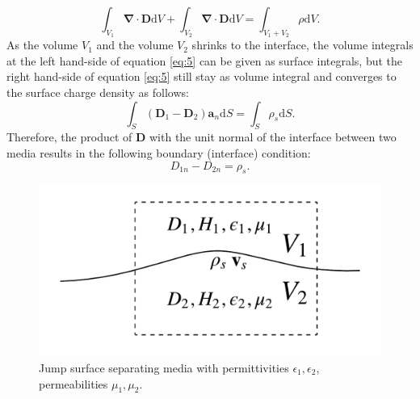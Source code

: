 \documentclass[11pt]{amsart}
\begin{document}
\begin{equation}
\label{eq:5}
\int_{V_1} \mathbf{\nabla}\cdot \mathbf{D} \mathrm{d} V + \int_{V_2} \mathbf{\nabla}\cdot \mathbf{D} \mathrm{d} V=\int_{V_1+V_2} \rho \mathrm{d} V.
\end{equation}
As the volume $V_1$ and the volume $V_2$ shrinks to the interface\cite{Chadwick}, the volume integrals at the left hand-side of equation \ref{eq:5} can be given as surface integrals, but the right hand-side of equation \ref{eq:5} still stay as volume integral and converges to the surface charge density as follows:
\begin{equation}
\label{eq:6}
\int_{S} (\mathbf{D}_1 -\mathbf{D}_2) \mathbf{a}_n\mathrm{d}S=\int_{S} \rho_s \mathrm{d}S.
\end{equation}
Therefore, the product of $\mathbf{D}$ with the unit normal of the interface between two media results in the following boundary (interface) condition:
\begin{equation}
D_{1n}-D_{2n}=\rho_s.
\end{equation}

\begin{figure}
\centering
 \includegraphics[scale=0.3]{JumpSurface}%
  \caption{Jump surface separating media with permittivities  $\epsilon_1,\epsilon_2$, permeabilities $\mu_1,\mu_2$. }
\label{fig:Jump}
\end{figure} 
\end{document}
